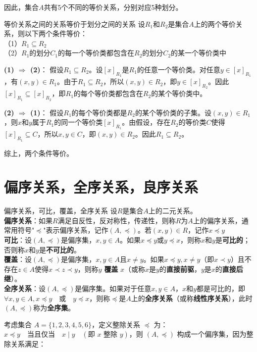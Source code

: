 \documentclass[lang=cn,11pt]{elegantbook}
\begin{document}
因此，集合$A$共有5个不同的等价关系，分别对应5种划分。
\begin{theorem}{等价关系之间的关系等价于划分之间的关系}
    设$R_1$和$R_2$是集合$A$上的两个等价关系，则以下两个条件等价：\\
    （1）$R_1 \subseteq R_2$\\
    （2）$R_1$的划分$C_1$的每一个等价类都包含在$R_2$的划分$C_2$的某一个等价类中
\end{theorem}
\textbf{(1) $\Rightarrow$ (2)}：
假设$R_1 \subseteq R_2$。设$[x]_{R_1}$是$R_1$的任意一个等价类。对任意$y \in [x]_{R_1}$，有$(x,y) \in R_1$。由于$R_1 \subseteq R_2$，所以$(x,y) \in R_2$，即$y \in [x]_{R_2}$。因此$[x]_{R_1} \subseteq [x]_{R_2}$，即$R_1$的每个等价类都包含在$R_2$的某个等价类中。

\textbf{(2) $\Rightarrow$ (1)}：
假设$R_1$的每个等价类都是$R_2$的某个等价类的子集。设$(x,y) \in R_1$，则$x$和$y$属于$R_1$的同一个等价类$[x]_{R_1}$。由假设，存在$R_2$的等价类$C$使得$[x]_{R_1} \subseteq C$，所以$x,y \in C$，即$(x,y) \in R_2$。因此$R_1 \subseteq R_2$。

综上，两个条件等价。
\section{偏序关系，全序关系，良序关系}
\begin{definition}{偏序关系，可比，覆盖，全序关系}
设$R$是集合$A$上的二元关系。\\
\textbf{偏序关系}：如果$R$满足自反性，反对称性，传递性，则称$R$为$A$上的偏序关系，通常用符号"$\preccurlyeq $"表示偏序关系，记作$(A, \preccurlyeq )$。若$(x,y)\in R$，记作$x \preccurlyeq  y$\\
\textbf{可比}：设$(A, \preccurlyeq )$是偏序集，$x,y \in A$。如果$x \preccurlyeq  y$或$y \preccurlyeq  x$，则称$x$和$y$是\textbf{可比的}；否则称$x$和$y$是\textbf{不可比的}。\\
\textbf{覆盖}：设$(A, \preccurlyeq )$是偏序集，$x,y \in A$且$x \neq y$。如果$x \preccurlyeq  y,x\neq y$（即$x\prec y$）且不存在$z \in A$使得$x \prec z\prec  y$，则称$y$ \textbf{覆盖} $x$（或称$x$是$y$的\textbf{直接前驱}，$y$是$x$的\textbf{直接后继}）。\\
\textbf{全序关系}：设$(A, \preccurlyeq)$是偏序集。如果对于任意$x, y \in A$，$x$和$y$都是可比的，即$\forall x, y \in A, x \preccurlyeq y \quad \text{或} \quad y \preccurlyeq x$，则称$\preccurlyeq$是$A$上的\textbf{全序关系}（或称\textbf{线性序关系}），此时$(A, \preccurlyeq)$称为\textbf{全序集}。
\end{definition}
考虑集合 $A = \{1, 2, 3, 4, 5, 6\}$，定义整除关系 $\preccurlyeq$ 为：$
x \preccurlyeq y \quad \text{当且仅当} \quad x \mid y \quad (\text{即 } x \text{ 整除 } y)$，则 $(A, \preccurlyeq)$ 构成一个偏序集，因为整除关系满足：
\end{document}

